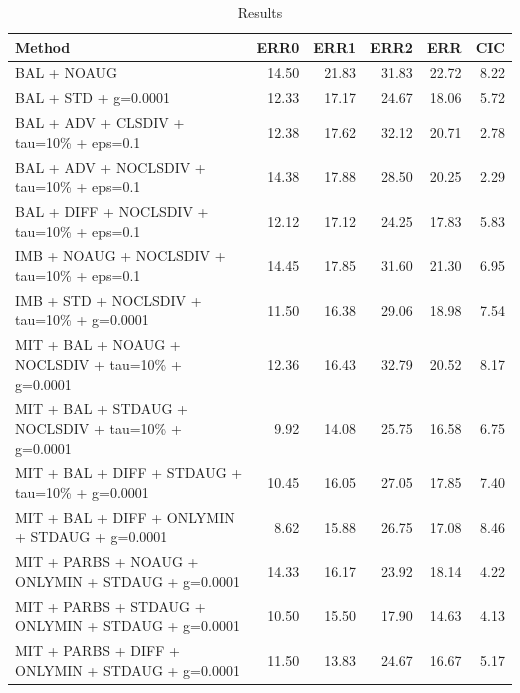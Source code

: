 \begin{table}
\caption{Results}
\label{tab:Results}
\begin{tabular}{lrrrrr}
\toprule
Method & ERR0 & ERR1 & ERR2 & ERR & CIC \\
\midrule
BAL + NOAUG & 14.50 & 21.83 & 31.83 & 22.72 & 8.22 \\
BAL + STD + g=0.0001 & 12.33 & 17.17 & 24.67 & 18.06 & 5.72 \\
BAL + ADV + CLSDIV + tau=10\% + eps=0.1 & 12.38 & 17.62 & 32.12 & 20.71 & 2.78 \\
BAL + ADV + NOCLSDIV + tau=10\% + eps=0.1 & 14.38 & 17.88 & 28.50 & 20.25 & 2.29 \\
BAL + DIFF + NOCLSDIV + tau=10\% + eps=0.1 & 12.12 & 17.12 & 24.25 & 17.83 & 5.83 \\
IMB + NOAUG + NOCLSDIV + tau=10\% + eps=0.1 & 14.45 & 17.85 & 31.60 & 21.30 & 6.95 \\
IMB + STD + NOCLSDIV + tau=10\% + g=0.0001 & 11.50 & 16.38 & 29.06 & 18.98 & 7.54 \\
MIT + BAL + NOAUG + NOCLSDIV + tau=10\% + g=0.0001 & 12.36 & 16.43 & 32.79 & 20.52 & 8.17 \\
MIT + BAL + STDAUG + NOCLSDIV + tau=10\% + g=0.0001 & 9.92 & 14.08 & 25.75 & 16.58 & 6.75 \\
MIT + BAL + DIFF + STDAUG + tau=10\% + g=0.0001 & 10.45 & 16.05 & 27.05 & 17.85 & 7.40 \\
MIT + BAL + DIFF + ONLYMIN + STDAUG + g=0.0001 & 8.62 & 15.88 & 26.75 & 17.08 & 8.46 \\
MIT + PARBS + NOAUG + ONLYMIN + STDAUG + g=0.0001 & 14.33 & 16.17 & 23.92 & 18.14 & 4.22 \\
MIT + PARBS + STDAUG + ONLYMIN + STDAUG + g=0.0001 & 10.50 & 15.50 & 17.90 & 14.63 & 4.13 \\
MIT + PARBS + DIFF + ONLYMIN + STDAUG + g=0.0001 & 11.50 & 13.83 & 24.67 & 16.67 & 5.17 \\
\bottomrule
\end{tabular}
\end{table}

